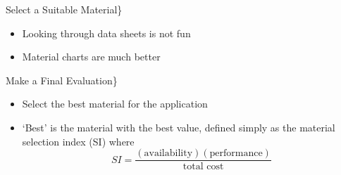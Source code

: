 \documentclass[10pt, svgnames]{beamer}
\begin{document}
\begin{frame}[label={sec:orgae5d983}]{Select a Suitable Material\}}
\centering
{}

\begin{itemize}
\item Looking through data sheets is not fun
\item Material charts are much better
\end{itemize}
\end{frame}



\begin{frame}[label={sec:orgc94adb2}]{Make a Final Evaluation\}}
\begin{itemize}
\item Select the best material for the application
\item `Best' is the material with the best value, defined simply as the material selection index (SI) where
$$ SI = \frac{(\text{availability})(\text{performance})}{\text{total cost}} $$
\end{itemize}
\end{frame}
\end{document}
